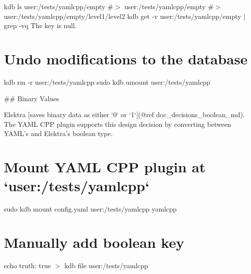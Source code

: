 kdb ls user\+:/tests/yamlcpp/empty \#$>$ user\+:/tests/yamlcpp/empty \#$>$ user\+:/tests/yamlcpp/empty/level1/level2 kdb get -\/v user\+:/tests/yamlcpp/empty $\vert$ grep -\/vq \textquotesingle{}The key is null.\textquotesingle{}\hypertarget{autotoc_md817_autotoc_md884}{}\section{Undo modifications to the database}\label{autotoc_md817_autotoc_md884}
kdb rm -\/r user\+:/tests/yamlcpp sudo kdb umount user\+:/tests/yamlcpp 
\begin{DoxyCode}
## Binary Values

Elektra [saves binary data as either `0` or `1`](@ref doc\_decisions\_boolean\_md). The YAML CPP plugin
       supports this design decision by converting between YAML’s and Elektra’s boolean type.
\end{DoxyCode}
 \hypertarget{autotoc_md817_autotoc_md885}{}\section{Mount Y\+A\+M\+L C\+P\+P plugin at `user\+:/tests/yamlcpp`}\label{autotoc_md817_autotoc_md885}
sudo kdb mount config.\+yaml user\+:/tests/yamlcpp yamlcpp \hypertarget{autotoc_md817_autotoc_md886}{}\section{Manually add boolean key}\label{autotoc_md817_autotoc_md886}
echo \textquotesingle{}truth\+: true\textquotesingle{} $>$ {\ttfamily kdb file user\+:/tests/yamlcpp}

